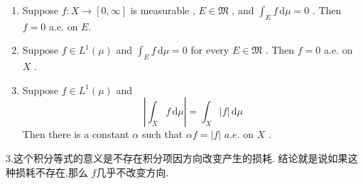 \documentclass[../main.tex]{subfiles}
\begin{document}
\begin{theorem}{}{}
    \begin{enumerate}
        \item Suppose \(  f: X\to \left[ 0,\infty \right]   \) is measurable , \(  E \in \mathfrak{M}  \) , and \(  \int_{E}f\,\mathrm{d} \mu   = 0\) . Then \(  f= 0  \) a.e. on \(  E  \).      
        \item Suppose \(  f \in L^{1}\left( \mu  \right)    \) and \(  \int_{E}f\,\mathrm{d} \mu = 0  \) for every \(  E \in \mathfrak{M}  \)    . Then \(  f= 0  \) a.e. on \(  X  \) .   
        \item Suppose \(  f \in L^{1}\left( \mu  \right)   \) and \[
        \left| \int_{X}f\,\mathrm{d} \mu  \right|= \int_{X}\left| f \right|\,\mathrm{d} \mu   
        \] Then there is a constant \(  \alpha    \) such that \(   \alpha f= \left| f \right|    \)   \(  a.e.  \)  on \(  X  \) .  
    \end{enumerate}
    
\end{theorem}
\begin{note}
    3.这个积分等式的意义是不存在积分项因方向改变产生的损耗.  结论就是说如果这种损耗不存在,那么 \(  f  \)几乎不改变方向.  
\end{note}
\end{document}
